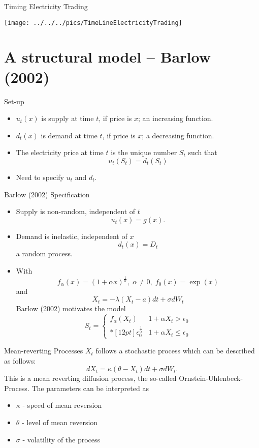 {Timing Electricity Trading}
\begin{center}
\texttt{[image: ../../../pics/TimeLineElectricityTrading]}
\end{center}

\section{A structural model -- Barlow (2002)}

{Set-up}
\begin{itemize}
\item<1-> $u_t(x)$ is supply at time $t$, if price is $x$; an increasing function.
\item<2-> $d_t(x)$ is demand at time $t$, if price is $x$; a decreasing function.
\item<3-> The electricity price at time $t$ is the unique number $S_t$ such that
$$
u_t(S_t)=d_t(S_t)
$$
\item<4-> Need to specify $u_t$ and $d_t$.
\end{itemize}

{Barlow (2002) Specification}
\begin{itemize}
\item<1-> Supply is non-random, independent of $t$
$$u_t(x)=g(x).$$
\item<2-> Demand is inelastic, independent of $x$
$$d_t(x)=D_t$$
a random process.
\item<3-> With
$$
f_\alpha(x) = (1+\alpha x)^\frac{1}{\alpha}, \;\alpha \not=0, \; f_0(x)=\exp(x)
$$
and
$$
X_t= -\lambda (X_t-a)dt +\sigma dW_t
$$
Barlow (2002) motivates the model
$$
S_t= \left \{ \begin{array}{ll}
\displaystyle
f_\alpha(X_t) & 1+\alpha  X_t> \epsilon_0 \\*[12pt]
\epsilon_0^\frac{1}{\alpha} & 1+\alpha X_t \leq \epsilon_0
\end{array}
\right.
$$

\end{itemize}

{Mean-reverting Processes}
$X_t$ follows a stochastic process which can be described as follows:
$$
dX_t= \kappa \left( \theta -X_t \right) dt + \sigma dW_t.
$$
This is  a mean reverting diffusion process, the so-called Ornstein-Uhlenbeck-Process.
The parameters can be interpreted as
\begin{itemize}
\item $\kappa$ - speed of mean reversion
\item $\theta$ - level of mean reversion
\item $\sigma$ - volatility of the process
\end{itemize}

